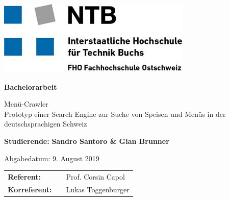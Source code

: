 \thispagestyle{empty}

\renewcommand*\chapterpagestyle{scrheadings}
\includegraphics[scale=0.5]{img/ntb.jpg}

\begin{center}
\vspace*{4 cm}
\textbf{\Huge Bachelorarbeit}
\end{center}

\begin{center}
\vspace*{1.5 cm}
\LARGE{\textsf{Menü-Crawler\\}}
\large{\textsf{Prototyp einer Search Engine zur Suche von Speisen und Menüs in der deutschsprachigen Schweiz\\}}
\end{center}


\begin{center}
\vspace*{2 cm}
\textbf{ Studierende:} {\textbf{Sandro Santoro \& Gian Brunner\\}}
\end{center}

\begin{center}
\vspace*{1 cm}
Abgabedatum: 9. August 2019
\vspace*{1 cm}
\end{center}


\begin{center}
\begin{tabular}{lll}
\textbf{Referent:} & & Prof. Corsin Capol\\
\medskip
\textbf{Korreferent:} & & Lukas Toggenburger\\
\end{tabular}
\end{center}
